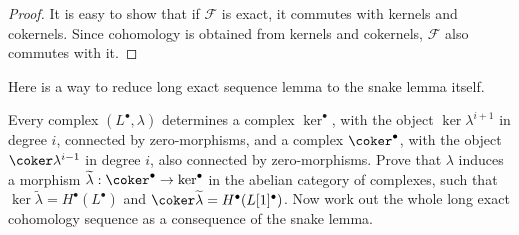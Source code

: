 \begin{proof}
It is easy to show that if $\mathscr{F}$ is exact, it commutes with kernels and cokernels. Since cohomology is obtained from kernels and cokernels, $\mathscr{F}$ also commutes with it.
\end{proof}
\begin{exercise}\label{long exact seq use snake}
Here is a way to reduce long exact sequence lemma to the snake lemma itself.\par
Every complex $(L^\bullet,\lambda)$ determines a complex $\ker^\bullet$, with the object $\ker\lambda^{i+1}$ in degree $i$, connected by zero-morphisms, and a complex 
$\coker^\bullet$, with the object $\coker\lambda^{i-1}$ in degree $i$, also connected by zero-morphisms. Prove that $\lambda$ induces a morphism 
$\widetilde{\lambda}:\coker^\bullet\to\ker^\bullet$ in the abelian category of complexes, such that $\ker\widetilde{\lambda}=H^\bullet(L^\bullet)$ and 
$\coker\widetilde{\lambda}=H^\bullet(L[1]^\bullet)$. Now work out the whole long exact cohomology sequence as a consequence of the snake lemma.
\end{exercise}
